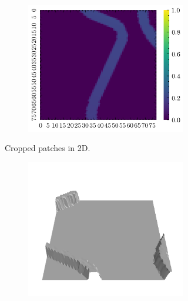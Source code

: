 \documentclass[../document.tex]{subfiles}
\begin{document}
\begin{figure} [htbp]
\begin{subfigure}[b]{1\textwidth}
\begin{subfigure}[b]{0.24\textwidth}
    \includegraphics[width=\linewidth]{../img/bars1-example-patches/2d/14.png}    
    \end{subfigure}  
\caption{Cropped patches in 2D.}
\end{subfigure}  
\begin{subfigure}[b]{1\textwidth}
    \begin{subfigure}[b]{0.24\textwidth}
    \includegraphics[width=\linewidth]{../img/bars1-example-patches/3d/2.png}    
    \end{subfigure}  

\end{subfigure}
\end{figure}
\end{document}
